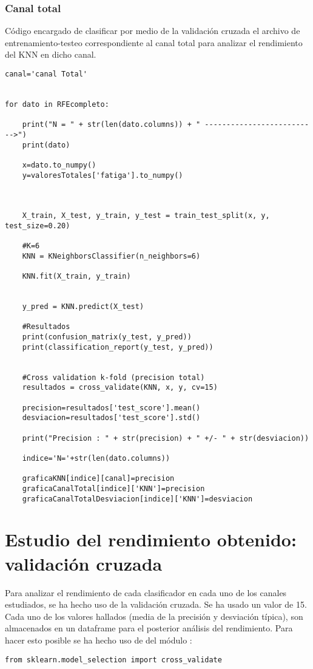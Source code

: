     \subsubsection{Canal total}
Código encargado de clasificar por medio de la validación cruzada el archivo de entrenamiento-testeo correspondiente al canal total para analizar el rendimiento del KNN en dicho canal.
\begin{lstlisting}
canal='canal Total'


for dato in RFEcompleto:
    
    print("N = " + str(len(dato.columns)) + " -------------------------->")
    print(dato)
    
    x=dato.to_numpy()
    y=valoresTotales['fatiga'].to_numpy()



    X_train, X_test, y_train, y_test = train_test_split(x, y, test_size=0.20)

    #K=6
    KNN = KNeighborsClassifier(n_neighbors=6)
    
    KNN.fit(X_train, y_train)


    y_pred = KNN.predict(X_test)

    #Resultados
    print(confusion_matrix(y_test, y_pred))
    print(classification_report(y_test, y_pred))

    
    #Cross validation k-fold (precision total)
    resultados = cross_validate(KNN, x, y, cv=15)
    
    precision=resultados['test_score'].mean()
    desviacion=resultados['test_score'].std()
    
    print("Precision : " + str(precision) + " +/- " + str(desviacion))
    
    indice='N='+str(len(dato.columns))
    
    graficaKNN[indice][canal]=precision
    graficaCanalTotal[indice]['KNN']=precision
    graficaCanalTotalDesviacion[indice]['KNN']=desviacion
\end{lstlisting}


\section{Estudio del rendimiento obtenido: validación cruzada}
Para analizar el rendimiento de cada clasificador en cada uno de los canales estudiados, se ha hecho uso de la validación cruzada. Se ha usado un valor de 15. Cada uno de los valores hallados (media de la precisión y desviación típica), son almacenados en un dataframe para el posterior análisis del rendimiento. Para hacer esto posible se ha hecho uso de del módulo  \cite{scikitCV}:
\begin{lstlisting}
from sklearn.model_selection import cross_validate
\end{lstlisting}

